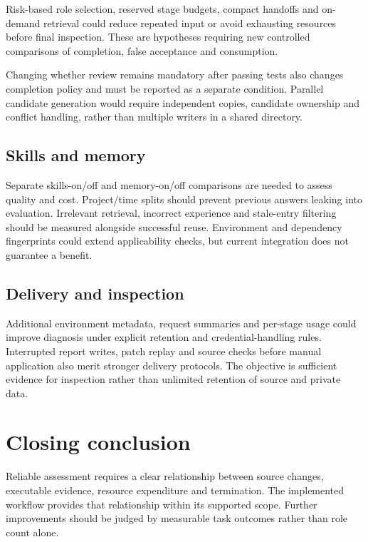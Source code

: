 Risk-based role selection, reserved stage budgets, compact handoffs and on-demand retrieval could reduce repeated input or avoid exhausting resources before final inspection. These are hypotheses requiring new controlled comparisons of completion, false acceptance and consumption.

Changing whether review remains mandatory after passing tests also changes completion policy and must be reported as a separate condition. Parallel candidate generation would require independent copies, candidate ownership and conflict handling, rather than multiple writers in a shared directory.

\subsection{Skills and memory}\label{sec:8.3.3}

Separate skills-on/off and memory-on/off comparisons are needed to assess quality and cost. Project/time splits should prevent previous answers leaking into evaluation. Irrelevant retrieval, incorrect experience and stale-entry filtering should be measured alongside successful reuse. Environment and dependency fingerprints could extend applicability checks, but current integration does not guarantee a benefit.

\subsection{Delivery and inspection}\label{sec:8.3.4}

Additional environment metadata, request summaries and per-stage usage could improve diagnosis under explicit retention and credential-handling rules. Interrupted report writes, patch replay and source checks before manual application also merit stronger delivery protocols. The objective is sufficient evidence for inspection rather than unlimited retention of source and private data.

\section{Closing conclusion}\label{sec:8.4}

Reliable assessment requires a clear relationship between source changes, executable evidence, resource expenditure and termination. The implemented workflow provides that relationship within its supported scope. Further improvements should be judged by measurable task outcomes rather than role count alone.
